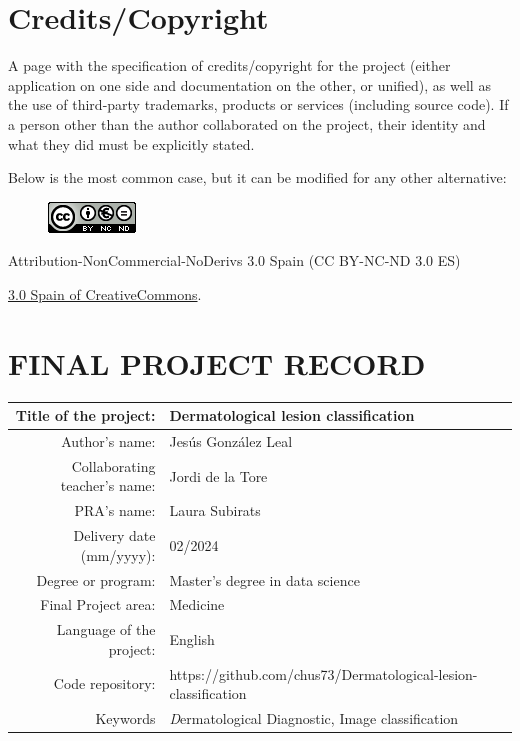 \setcounter{page}{1}
\pagestyle{plain}

\chapter*{Credits/Copyright}

A page with the specification of credits/copyright for the project (either application on one side and documentation on the other, or unified), as well as the use of third-party trademarks, products or services (including source code). If a person other than the author collaborated on the project, their identity and what they did must be explicitly stated.

Below is the most common case, but it can be modified for any other alternative:

\vspace{1cm}

\begin{figure}[ht]
\centering
\includegraphics[scale=1]{images/license.png}
\end{figure}

Attribution-NonCommercial-NoDerivs 3.0 Spain (CC BY-NC-ND 3.0 ES) 

\href{https://creativecommons.org/licenses/by-nc-nd/3.0/es/}{3.0 Spain of CreativeCommons}.

\chapter*{FINAL PROJECT RECORD}

\begin{table}[ht]
\centering{}
\renewcommand{\arraystretch}{2}
\begin{tabular}{r | l}
\hline
Title of the project: & Dermatological lesion classification\\
\hline
Author's name: & Jesús González Leal\\
\hline
Collaborating teacher's name: & Jordi de la Tore\\
\hline
PRA's name: & Laura Subirats\\
\hline
Delivery date (mm/yyyy): & 02/2024\\
\hline
Degree or program: & Master’s degree in data science\\
\hline
Final Project area: & Medicine\\
\hline
Language of the project: & English\\
\hline
Code repository: & https://github.com/chus73/Dermatological-lesion-classification\\

\hline
Keywords & \textit Dermatological Diagnostic, Image classification  \\
\hline
\end{tabular}
\end{table}

